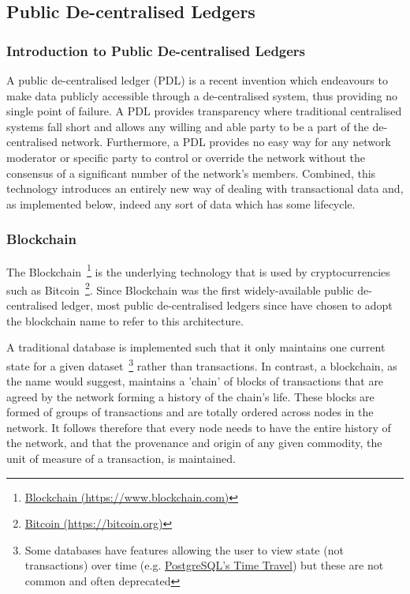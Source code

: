 \subsection{Public De-centralised Ledgers}

\subsubsection{Introduction to Public De-centralised Ledgers}

A public de-centralised ledger (PDL) is a recent invention which endeavours to make data publicly accessible through a de-centralised system, thus providing no single point of failure. A PDL provides transparency where traditional centralised systems fall short and allows any willing and able party to be a part of the de-centralised network. Furthermore, a PDL provides no easy way for any network moderator or specific party to control or override the network without the consensus of a significant number of the network's members. Combined, this technology introduces an entirely new way of dealing with transactional data and, as implemented below, indeed any sort of data which has some lifecycle.

\subsubsection{Blockchain}

The Blockchain~\footnote{\href{https://www.blockchain.com/}{Blockchain (https://www.blockchain.com)}} is the underlying technology that is used by cryptocurrencies such as Bitcoin~\footnote{\href{https://bitcoin.org/en/}{Bitcoin (https://bitcoin.org)}}. Since Blockchain was the first widely-available public de-centralised ledger, most public de-centralised ledgers since have chosen to adopt the blockchain name to refer to this architecture.

A traditional database is implemented such that it only maintains one current state for a given dataset~\footnote{Some databases have features allowing the user to view state (not transactions) over time (e.g. \href{https://www.postgresql.org/docs/6.3/static/c0503.htm}{PostgreSQL's Time Travel}) but these are not common and often deprecated} rather than transactions. In contrast, a blockchain, as the name would suggest, maintains a 'chain' of blocks of transactions that are agreed by the network forming a history of the chain's life. These blocks are formed of groups of transactions and are totally ordered across nodes in the network. It follows therefore that every node needs to have the entire history of the network, and that the provenance and origin of any given commodity, the unit of measure of a transaction, is maintained.

